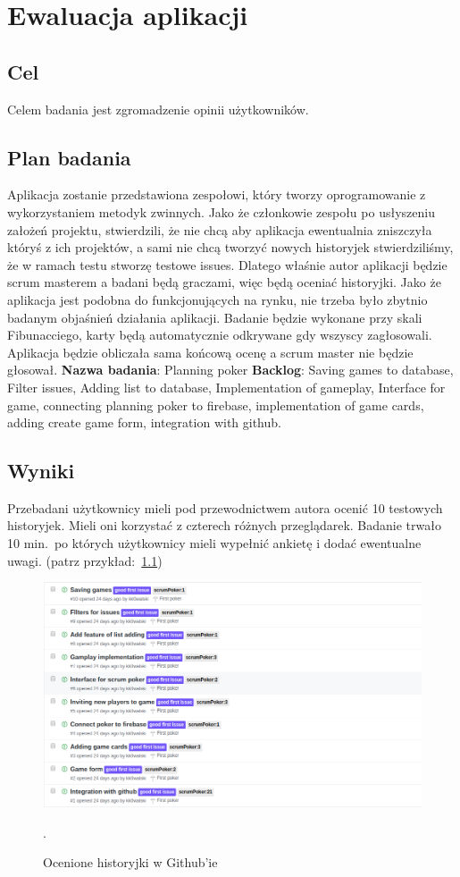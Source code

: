 \chapter{Ewaluacja aplikacji}

\section{Cel}

Celem badania jest zgromadzenie opinii użytkowników.

\section{Plan badania}

Aplikacja zostanie przedstawiona zespołowi,
który tworzy oprogramowanie z wykorzystaniem metodyk zwinnych.
Jako że członkowie zespołu po usłyszeniu założeń projektu, stwierdzili,
że nie chcą aby aplikacja ewentualnia zniszczyła któryś z ich projektów,
a sami nie chcą tworzyć nowych historyjek stwierdziliśmy,
że w ramach testu stworzę testowe issues.
Dlatego właśnie autor aplikacji będzie scrum masterem a badani będą graczami,
więc będą oceniać historyjki.
Jako że aplikacja jest podobna do funkcjonujących na rynku,
nie trzeba było zbytnio badanym objaśnień działania aplikacji.
Badanie będzie wykonane przy skali Fibunacciego,
karty będą automatycznie odkrywane gdy wszyscy zagłosowali.
 Aplikacja będzie obliczała sama końcową ocenę a scrum master nie będzie głosował.
 \textbf{Nazwa badania}: Planning poker
 \textbf{Backlog}: Saving games to database, Filter issues, Adding list to database,
 Implementation of gameplay, Interface for game, connecting planning poker to firebase,
implementation of game cards, adding create game form, integration with github.

\section{Wyniki}

Przebadani użytkownicy mieli pod przewodnictwem autora ocenić 10 testowych historyjek.
Mieli oni korzystać z czterech różnych przeglądarek.
Badanie trwało 10 min.\ po których użytkownicy mieli wypełnić ankietę i dodać ewentualne uwagi.
(patrz przykład:~\ref{rys:wynikBadania})
\begin{figure}
	\centering\includegraphics[width=.9\textwidth]{img/wynikBadania.png}
	\caption{Ocenione historyjki w Github'ie}.
~\label{rys:wynikBadania}
\end{figure}

